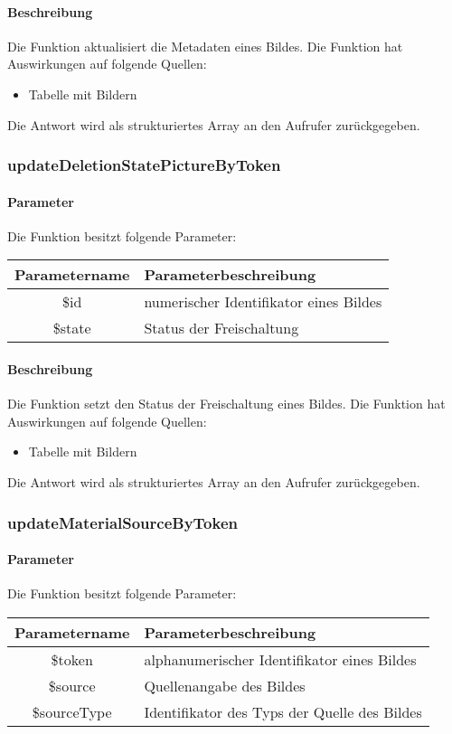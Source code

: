 \paragraph{Beschreibung} Die Funktion aktualisiert die Metadaten eines Bildes. Die Funktion hat Auswirkungen auf folgende Quellen:
\begin{itemize}
	\item Tabelle mit Bildern
\end{itemize}
Die Antwort wird als strukturiertes Array an den Aufrufer zurückgegeben.
\subsubsection{updateDeletionStatePictureByToken}
\paragraph{Parameter} Die Funktion besitzt folgende Parameter:
\begin{table}[H]
	\begin{tabular}{|c|p{11cm}|}
		\hline
		\textbf{Parametername} & \textbf{Parameterbeschreibung} \\ \hline
		\$id    & numerischer Identifikator eines Bildes \\ \hline
		\$state & Status der Freischaltung \\ \hline
	\end{tabular}
\end{table}
\paragraph{Beschreibung} Die Funktion setzt den Status der Freischaltung eines Bildes. Die Funktion hat Auswirkungen auf folgende Quellen:
\begin{itemize}
	\item Tabelle mit Bildern
\end{itemize}
Die Antwort wird als strukturiertes Array an den Aufrufer zurückgegeben.
\subsubsection{updateMaterialSourceByToken}
\paragraph{Parameter} Die Funktion besitzt folgende Parameter:
\begin{table}[H]
	\begin{tabular}{|c|p{11cm}|}
		\hline
		\textbf{Parametername} & \textbf{Parameterbeschreibung} \\ \hline
		\$token       & alphanumerischer Identifikator eines Bildes \\ \hline
		\$source      & Quellenangabe des Bildes \\ \hline
		\$sourceType  & Identifikator des Typs der Quelle des Bildes \\ \hline
	\end{tabular}
\end{table}
